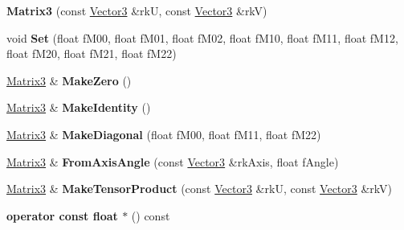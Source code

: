 \begin{DoxyCompactItemize}
\item 
{\bfseries Matrix3} (const \hyperlink{class_magnum_1_1_vector3}{Vector3} \&rkU, const \hyperlink{class_magnum_1_1_vector3}{Vector3} \&rkV)\hypertarget{class_magnum_1_1_matrix3_a4d8193b43b5c7133f5c0d42037f16114}{}\label{class_magnum_1_1_matrix3_a4d8193b43b5c7133f5c0d42037f16114}

\item 
void {\bfseries Set} (float f\+M00, float f\+M01, float f\+M02, float f\+M10, float f\+M11, float f\+M12, float f\+M20, float f\+M21, float f\+M22)\hypertarget{class_magnum_1_1_matrix3_a4283ec56bbd2a02973273964089ee3ef}{}\label{class_magnum_1_1_matrix3_a4283ec56bbd2a02973273964089ee3ef}

\item 
\hyperlink{class_magnum_1_1_matrix3}{Matrix3} \& {\bfseries Make\+Zero} ()\hypertarget{class_magnum_1_1_matrix3_abe42a37c1c5eccca39510752401f0b8f}{}\label{class_magnum_1_1_matrix3_abe42a37c1c5eccca39510752401f0b8f}

\item 
\hyperlink{class_magnum_1_1_matrix3}{Matrix3} \& {\bfseries Make\+Identity} ()\hypertarget{class_magnum_1_1_matrix3_ab4c1e3d6f864fa5c3df4db6be0d1cb63}{}\label{class_magnum_1_1_matrix3_ab4c1e3d6f864fa5c3df4db6be0d1cb63}

\item 
\hyperlink{class_magnum_1_1_matrix3}{Matrix3} \& {\bfseries Make\+Diagonal} (float f\+M00, float f\+M11, float f\+M22)\hypertarget{class_magnum_1_1_matrix3_ab60e755c97ed19f2f59fdddb858976da}{}\label{class_magnum_1_1_matrix3_ab60e755c97ed19f2f59fdddb858976da}

\item 
\hyperlink{class_magnum_1_1_matrix3}{Matrix3} \& {\bfseries From\+Axis\+Angle} (const \hyperlink{class_magnum_1_1_vector3}{Vector3} \&rk\+Axis, float f\+Angle)\hypertarget{class_magnum_1_1_matrix3_a5198d2623abd8a096ff0f7b322df48f7}{}\label{class_magnum_1_1_matrix3_a5198d2623abd8a096ff0f7b322df48f7}

\item 
\hyperlink{class_magnum_1_1_matrix3}{Matrix3} \& {\bfseries Make\+Tensor\+Product} (const \hyperlink{class_magnum_1_1_vector3}{Vector3} \&rkU, const \hyperlink{class_magnum_1_1_vector3}{Vector3} \&rkV)\hypertarget{class_magnum_1_1_matrix3_a4afbbb24447e4e37c883a3dbea034ec4}{}\label{class_magnum_1_1_matrix3_a4afbbb24447e4e37c883a3dbea034ec4}

\item 
{\bfseries operator const float $\ast$} () const \hypertarget{class_magnum_1_1_matrix3_ae9c99183f05c7ecd318b272034c31422}{}\label{class_magnum_1_1_matrix3_ae9c99183f05c7ecd318b272034c31422}


\end{DoxyCompactItemize}
